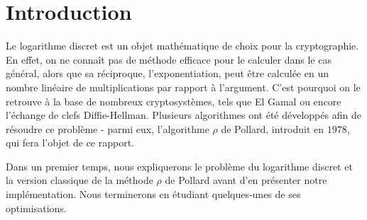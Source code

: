 \chapter*{Introduction}
Le logarithme discret est un objet mathématique de choix pour la cryptographie. En effet, on ne connaît pas de méthode efficace pour le calculer dans le cas général, alors que sa réciproque, l'exponentiation, peut être calculée en un nombre linéaire de multiplications par rapport à l'argument. C'est pourquoi on le retrouve à la base de nombreux cryptosystèmes, tels que El Gamal ou encore l'échange de clefs Diffie-Hellman. Plusieurs algorithmes ont été développés afin de résoudre ce problème - parmi eux, l'algorithme $\rho$ de Pollard, introduit en $1978$, qui fera l'objet de ce rapport.

Dans un premier temps, nous expliquerons le problème du logarithme discret et la version classique de la méthode $\rho$ de Pollard avant d'en présenter notre implémentation. Nous terminerons en étudiant quelques-unes de ses optimisations.
